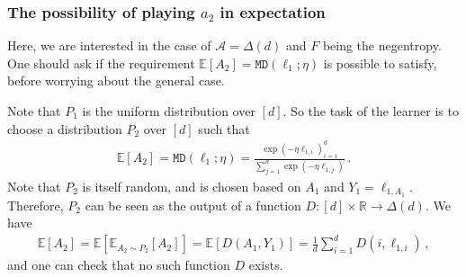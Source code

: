 \documentclass{article}
\theoremstyle{plain}
\theoremstyle{definition}
\newcommand{\R}{\mathbb R}
\newcommand{\E}{\mathbb E}
\newcommand{\cA}{\mathcal A}
\newcommand{\fmd}{\texttt{MD}}
\begin{document}
\subsubsection{The possibility of playing \texorpdfstring{$a_2$}{a\_2} in expectation}
Here, we are interested in the case of $\cA = \Delta(d)$ and $F$ being the negentropy.
One should ask if the requirement $\E[A_2] = \fmd(\ell_{1}; \eta)$ is possible to satisfy,
before worrying about the general case.

Note that $P_1$ is the uniform distribution over $[d]$.
So the task of the learner is to choose a distribution $P_2$ over $[d]$ such that
\begin{align*}
    \E[A_2] = \fmd(\ell_1; \eta) = \frac{\exp(-\eta \ell_{1,i})_{i=1}^{d}}{\sum_{j=1}^{d} \exp(-\eta \ell_{1,j})}\,.
\end{align*}
Note that $P_2$ is itself random, and is chosen based on $A_1$ and $Y_1 = \ell_{1, A_1}$.
Therefore, $P_2$ can be seen as the output of a function $D: [d] \times \R \to \Delta(d)$.
We have
\begin{align*}
    \E[A_2] = \E[\E_{A_2 \sim P_2}[A_2]] = \E[D(A_1, Y_1)] = \frac{1}{d} \sum_{i=1}^{d} D(i, \ell_{1,i})\,,
\end{align*}
and one can check that no such function $D$ exists.

\clearpage


\end{document}

